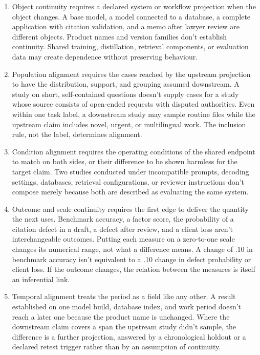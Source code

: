\documentclass[12pt]{article}
\begin{document}
\begin{enumerate}
\item Object continuity requires a declared system or workflow projection when the object changes. A base model, a model connected to a database, a complete application with citation validation, and a memo after lawyer review are different objects. Product names and version families don't establish continuity. Shared training, distillation, retrieval components, or evaluation data may create dependence without preserving behaviour.

\item Population alignment requires the cases reached by the upstream projection to have the distribution, support, and grouping assumed downstream. A study on short, self-contained questions doesn't supply cases for a study whose source consists of open-ended requests with disputed authorities. Even within one task label, a downstream study may sample routine files while the upstream claim includes novel, urgent, or multilingual work. The inclusion rule, not the label, determines alignment.

\item Condition alignment requires the operating conditions of the shared endpoint to match on both sides, or their difference to be shown harmless for the target claim. Two studies conducted under incompatible prompts, decoding settings, databases, retrieval configurations, or reviewer instructions don't compose merely because both are described as evaluating the same system.

\item Outcome and scale continuity requires the first edge to deliver the quantity the next uses. Benchmark accuracy, a factor score, the probability of a citation defect in a draft, a defect after review, and a client loss aren't interchangeable outcomes. Putting each measure on a zero-to-one scale changes its numerical range, not what a difference means. A change of .10 in benchmark accuracy isn't equivalent to a .10 change in defect probability or client loss. If the outcome changes, the relation between the measures is itself an inferential link.

\item Temporal alignment treats the period as a field like any other. A result established on one model build, database index, and work period doesn't reach a later one because the product name is unchanged. Where the downstream claim covers a span the upstream study didn't sample, the difference is a further projection, answered by a chronological holdout or a declared retest trigger rather than by an assumption of continuity.
\end{enumerate}
\end{document}
